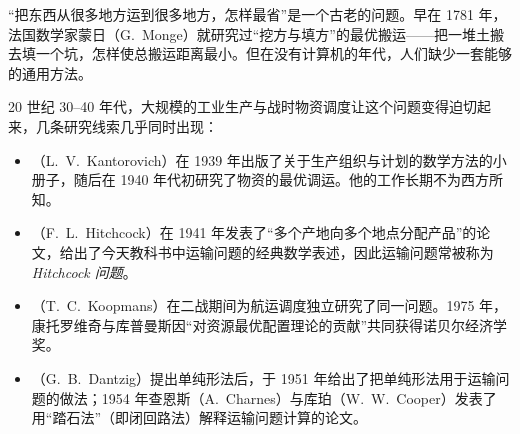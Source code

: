 \begin{historybox}[人们最初遇到的问题]
“把东西从很多地方运到很多地方，怎样最省”是一个古老的问题。早在 1781 年，法国数学家蒙日（G.~Monge）就研究过“挖方与填方”的最优搬运——把一堆土搬去填一个坑，怎样使总搬运距离最小。但在没有计算机的年代，人们缺少一套能够的通用方法。
\end{historybox}

20 世纪 30--40 年代，大规模的工业生产与战时物资调度让这个问题变得迫切起来，几条研究线索几乎同时出现：

\begin{center}
\end{center}

\begin{itemize}
\item {}（L.~V.~Kantorovich）在 1939 年出版了关于生产组织与计划的数学方法的小册子，随后在 1940 年代初研究了物资的最优调运。他的工作长期不为西方所知。
\item {}（F.~L.~Hitchcock）在 1941 年发表了“多个产地向多个地点分配产品”的论文，给出了今天教科书中运输问题的经典数学表述，因此运输问题常被称为 \emph{Hitchcock 问题}。
\item {}（T.~C.~Koopmans）在二战期间为航运调度独立研究了同一问题。1975 年，康托罗维奇与库普曼斯因“对资源最优配置理论的贡献”共同获得诺贝尔经济学奖。
\item {}（G.~B.~Dantzig）提出单纯形法后，于 1951 年给出了把单纯形法用于运输问题的做法；1954 年查恩斯（A.~Charnes）与库珀（W.~W.~Cooper）发表了用“踏石法”（即闭回路法）解释运输问题计算的论文。
\end{itemize}

